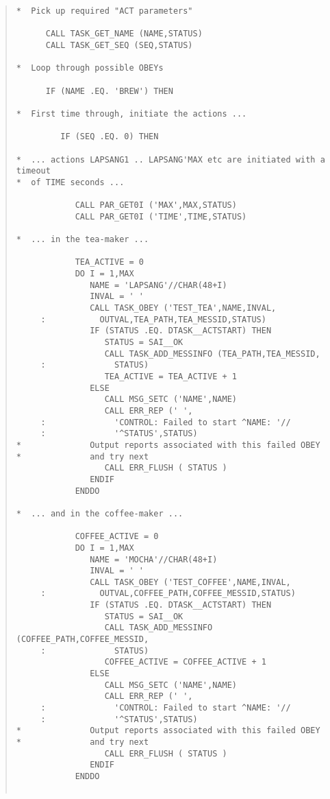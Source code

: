 \begin{quote}
\begin{verbatim}
*  Pick up required "ACT parameters"

      CALL TASK_GET_NAME (NAME,STATUS)
      CALL TASK_GET_SEQ (SEQ,STATUS)

*  Loop through possible OBEYs
 
      IF (NAME .EQ. 'BREW') THEN
 
*  First time through, initiate the actions ...
 
         IF (SEQ .EQ. 0) THEN

*  ... actions LAPSANG1 .. LAPSANG'MAX etc are initiated with a timeout
*  of TIME seconds ...

            CALL PAR_GET0I ('MAX',MAX,STATUS)
            CALL PAR_GET0I ('TIME',TIME,STATUS)

*  ... in the tea-maker ...

            TEA_ACTIVE = 0
            DO I = 1,MAX
               NAME = 'LAPSANG'//CHAR(48+I)
               INVAL = ' '
               CALL TASK_OBEY ('TEST_TEA',NAME,INVAL,
     :           OUTVAL,TEA_PATH,TEA_MESSID,STATUS)
               IF (STATUS .EQ. DTASK__ACTSTART) THEN
                  STATUS = SAI__OK
                  CALL TASK_ADD_MESSINFO (TEA_PATH,TEA_MESSID,
     :              STATUS)
                  TEA_ACTIVE = TEA_ACTIVE + 1
               ELSE
                  CALL MSG_SETC ('NAME',NAME)
                  CALL ERR_REP (' ',
     :              'CONTROL: Failed to start ^NAME: '//
     :              '^STATUS',STATUS)
*              Output reports associated with this failed OBEY
*              and try next
                  CALL ERR_FLUSH ( STATUS )
               ENDIF
            ENDDO

*  ... and in the coffee-maker ...

            COFFEE_ACTIVE = 0
            DO I = 1,MAX
               NAME = 'MOCHA'//CHAR(48+I)
               INVAL = ' '
               CALL TASK_OBEY ('TEST_COFFEE',NAME,INVAL,
     :           OUTVAL,COFFEE_PATH,COFFEE_MESSID,STATUS)
               IF (STATUS .EQ. DTASK__ACTSTART) THEN
                  STATUS = SAI__OK
                  CALL TASK_ADD_MESSINFO (COFFEE_PATH,COFFEE_MESSID,
     :              STATUS)
                  COFFEE_ACTIVE = COFFEE_ACTIVE + 1
               ELSE
                  CALL MSG_SETC ('NAME',NAME)
                  CALL ERR_REP (' ',
     :              'CONTROL: Failed to start ^NAME: '//
     :              '^STATUS',STATUS)
*              Output reports associated with this failed OBEY
*              and try next
                  CALL ERR_FLUSH ( STATUS )
               ENDIF
            ENDDO
 

\end{verbatim}
\end{quote}
